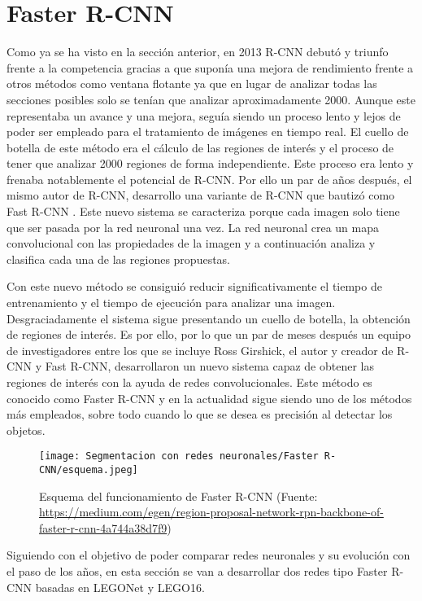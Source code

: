 \section{Faster R-CNN}
Como ya se ha visto en la sección anterior, en 2013 R-CNN debutó y triunfo frente a la competencia gracias a que suponía una mejora de rendimiento frente a otros métodos como ventana flotante ya que en lugar de analizar todas las secciones posibles solo se tenían que analizar aproximadamente 2000. Aunque este representaba un avance y una mejora, seguía siendo un proceso lento y lejos de poder ser empleado para el tratamiento de imágenes en tiempo real. El cuello de botella de este método era el cálculo de las regiones de interés y el proceso de tener que analizar 2000 regiones de forma independiente. Este proceso era lento y frenaba notablemente el potencial de R-CNN. Por ello un par de años después, el mismo autor de R-CNN, desarrollo una variante de R-CNN que bautizó como Fast R-CNN \citep{Fast_RCNN}. Este nuevo sistema se caracteriza porque cada imagen solo tiene que ser pasada por la red neuronal una vez. La red neuronal crea un mapa convolucional con las propiedades de la imagen y a continuación analiza y clasifica cada una de las regiones propuestas.

Con este nuevo método se consiguió reducir significativamente el tiempo de entrenamiento y el tiempo de ejecución para analizar una imagen. Desgraciadamente el sistema sigue presentando un cuello de botella, la obtención de regiones de interés. Es por ello, por lo que un par de meses después un equipo de investigadores entre los que se incluye Ross Girshick, el autor y creador de R-CNN y Fast R-CNN, desarrollaron un nuevo sistema capaz de obtener las regiones de interés con la ayuda de redes convolucionales. Este método es conocido como Faster R-CNN \citep{Faster_RCNN} y en la actualidad sigue siendo uno de los métodos más empleados, sobre todo cuando lo que se desea es precisión al detectar los objetos.

\begin{figure}[ht]  %
	\centering
	\texttt{[image: Segmentacion con redes neuronales/Faster R-CNN/esquema.jpeg]}
	\caption[Esquema del funcionamiento de Faster R-CNN]{Esquema del funcionamiento de Faster R-CNN (Fuente: \url{https://medium.com/egen/region-proposal-network-rpn-backbone-of-faster-r-cnn-4a744a38d7f9})}
	\label{fig:Faster R-CNN esquema}
\end{figure}

Siguiendo con el objetivo de poder comparar redes neuronales y su evolución con el paso de los años, en esta sección se van a desarrollar dos redes tipo Faster R-CNN basadas en LEGONet y LEGO16.
\newpage
